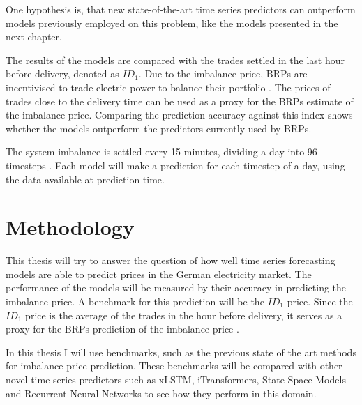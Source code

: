 \documentclass[class=scrbook, crop=false]{standalone}
\begin{document}
One hypothesis is, that new state-of-the-art time series predictors can outperform models previously employed on this problem, like the models presented in the next chapter. 

The results of the models are compared with the trades settled in the last hour before delivery, denoted as $ID_1$. Due to the imbalance price, BRPs are incentivised to trade electric power to balance their portfolio \cite{kochPASSIVEBALANCINGINTRADAY2020a}. The prices of trades close to the delivery time can be used as a proxy for the BRPs estimate of the imbalance price. Comparing the prediction accuracy against this index shows whether the models outperform the predictors currently used by BRPs.


 The system imbalance is settled every 15 minutes, dividing a day into 96 timesteps \cite{NetztransparenzReBAP}.
 Each model will make a prediction for each timestep of a day, using the data available at prediction time.



\section{Methodology}
\label{Section::Methodology}
This thesis will try to answer the question of how well time series forecasting models are able to predict prices in the German electricity market. The performance of the models will be measured by their accuracy in predicting the imbalance price. A benchmark for this prediction will be the $ID_1$ price. Since the $ID_1$ price is the average of the trades in the hour before delivery, it serves as a proxy for the BRPs prediction of the imbalance price \cite{narajewskiProbabilisticForecastingGerman2022}. 

In this thesis I will use benchmarks, such as the previous state of the art methods for imbalance price prediction. These benchmarks will be compared with other novel time series predictors such as xLSTM, iTransformers, State Space Models and Recurrent Neural Networks to see how they perform in this domain.
\end{document}
